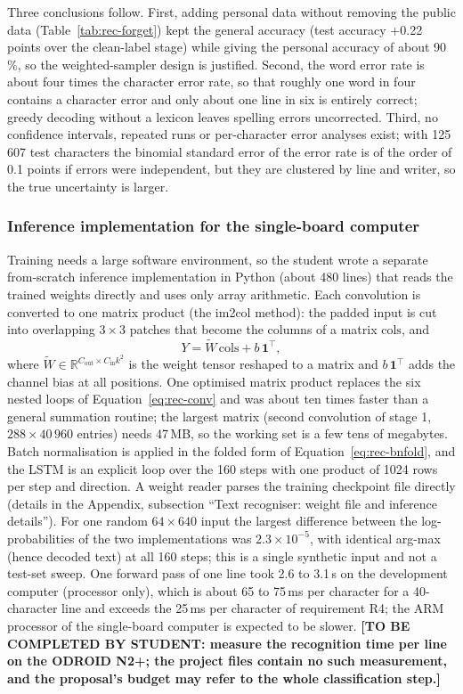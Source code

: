 Three conclusions follow.
First, adding personal data without removing the public data (Table~\ref{tab:rec-forget}) kept the general accuracy (test accuracy +0.22 points over the clean-label stage) while giving the personal accuracy of about 90\,\%, so the weighted-sampler design is justified.
Second, the word error rate is about four times the character error rate, so that roughly one word in four contains a character error and only about one line in six is entirely correct; greedy decoding without a lexicon leaves spelling errors uncorrected.
Third, no confidence intervals, repeated runs or per-character error analyses exist; with 125\,607 test characters the binomial standard error of the error rate is of the order of 0.1 points if errors were independent, but they are clustered by line and writer, so the true uncertainty is larger.

\subsubsection{Inference implementation for the single-board computer}

Training needs a large software environment, so the student wrote a separate from-scratch inference implementation in Python (about 480 lines) that reads the trained weights directly and uses only array arithmetic.
Each convolution is converted to one matrix product (the im2col method): the padded input is cut into overlapping $3\times3$ patches that become the columns of a matrix $\mathrm{cols}$, and
\begin{equation}
Y=\tilde W\,\mathrm{cols}+b\,\mathbf 1^{\top},
\label{eq:rec-im2col}
\end{equation}
where $\tilde W\in\mathbb R^{C_{\mathrm{out}}\times C_{\mathrm{in}}k^2}$ is the weight tensor reshaped to a matrix and $b\,\mathbf 1^\top$ adds the channel bias at all positions.
One optimised matrix product replaces the six nested loops of Equation~\ref{eq:rec-conv} and was about ten times faster than a general summation routine; the largest matrix (second convolution of stage 1, $288\times40\,960$ entries) needs 47\,MB, so the working set is a few tens of megabytes.
Batch normalisation is applied in the folded form of Equation~\ref{eq:rec-bnfold}, and the LSTM is an explicit loop over the 160 steps with one product of 1024 rows per step and direction.
A weight reader parses the training checkpoint file directly (details in the Appendix, subsection ``Text recogniser: weight file and inference details'').
For one random $64\times640$ input the largest difference between the log-probabilities of the two implementations was $2.3\times10^{-5}$, with identical arg-max (hence decoded text) at all 160 steps; this is a single synthetic input and not a test-set sweep.
One forward pass of one line took 2.6 to 3.1\,s on the development computer (processor only), which is about 65 to 75\,ms per character for a 40-character line and exceeds the 25\,ms per character of requirement R4; the ARM processor of the single-board computer is expected to be slower.
\textbf{[TO BE COMPLETED BY STUDENT: measure the recognition time per line on the ODROID N2+; the project files contain no such measurement, and the proposal's budget may refer to the whole classification step.]}

